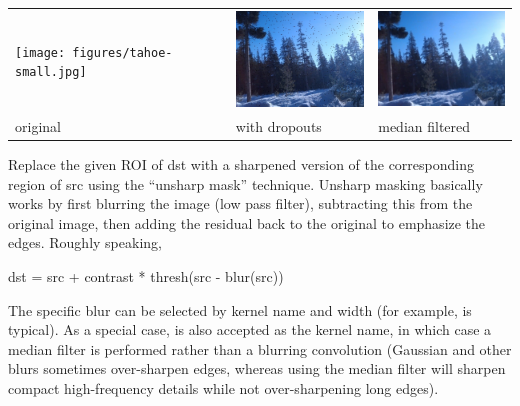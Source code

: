 \spc \begin{tabular}{lll}
\texttt{[image: figures/tahoe-small.jpg]} &
\includegraphics[width=1.5in]{figures/tahoe-pepper.jpg} &
\includegraphics[width=1.5in]{figures/tahoe-pepper-median.jpg} \\
original & with dropouts & median filtered \\
\end{tabular}

\apiend


 
\label{sec:iba:unsharpmask}

Replace the given ROI of {\cf dst} with a sharpened version of the
corresponding region of {\cf src} using the ``unsharp mask'' technique.
Unsharp masking basically works by first blurring the image (low
pass filter), subtracting this from the original image, then
adding the residual back to the original to emphasize the edges.
Roughly speaking,

\begin{code}
     dst = src + contrast * thresh(src - blur(src))
\end{code}

The specific blur can be selected by kernel name and width (for example,
 is typical). As a special case,  is also accepted
as the kernel name, in which case a median filter is performed rather than
a blurring convolution (Gaussian and other blurs sometimes over-sharpen edges,
whereas using the median filter will sharpen compact high-frequency details
while not over-sharpening long edges).


